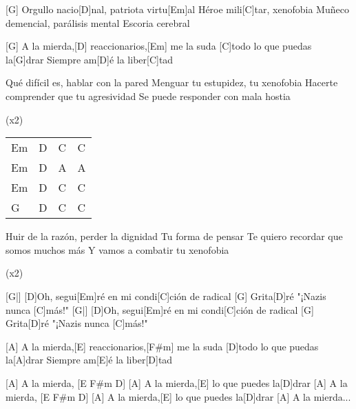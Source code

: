 

\begin{guitar}
	[G] Orgullo nacio[D]nal, patriota virtu[Em]al
	Héroe mili[C]tar, xenofobia
	Muñeco demencial, parálisis mental
	Escoria cerebral
	
	[G] A la mierda,[D] reaccionarios,[Em] me la suda [C]todo lo que puedas la[G]drar
	Siempre am[D]{é} la liber[C]tad
	
	Qué difícil es, hablar con la pared
	Menguar tu estupidez, tu xenofobia
	Hacerte comprender que tu agresividad
	Se puede responder con mala hostia
	
	  (x2)
	
	{\footnotesize\begin{tabular}{l|l|l|l}
			Em & D & C & C \\
			Em & D & A & A \\
			Em & D & C & C \\
			G & D & C & C 
	\end{tabular}}
	
	Huir de la razón, perder la dignidad
	Tu forma de pensar
	Te quiero recordar que somos muchos más
	Y vamos a combatir tu xenofobia
	
	  (x2)
	
	
	[G|] [D]Oh, segui[Em]ré en mi condi[C]ción de radical
	[G] Grita[D]ré "¡Nazis nunca [C]más!"
	[G|] [D]Oh, segui[Em]ré en mi condi[C]ción de radical
	[G] Grita[D]ré "¡Nazis nunca [C]más!"
	
	[A] A la mierda,[E] reaccionarios,[F#m] me la suda [D]todo lo que puedas la[A]drar
	Siempre am[E]{é} la liber[D]tad
	
	[A] A la mierda, [E F#m D]{}
	[A] A la mierda,[E] lo que puedes la[D]drar
	[A] A la mierda, [E F#m D]{}
	[A] A la mierda,[E] lo que puedes la[D]drar
	[A] A la mierda...
\end{guitar}